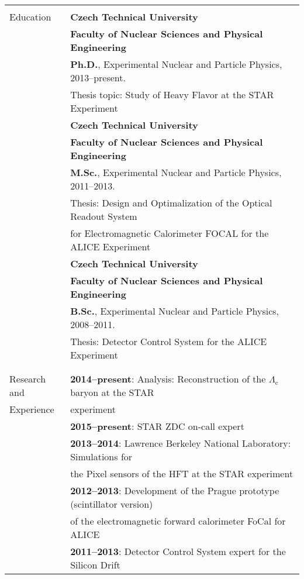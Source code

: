 \documentclass[a4paper,11pt,oneside]{article}
\begin{document}
\noindent \begin{tabular}{@{} l l}
\hline \\
 \Large{Education}    & \textbf{Czech Technical University} \\
     & \textbf{Faculty of Nuclear Sciences and Physical Engineering} \\
     & \textbf{Ph.D.}, Experimental Nuclear and Particle Physics, 2013--present. \\
     & Thesis topic: Study of Heavy Flavor at the STAR Experiment \\[.2cm]
     & \textbf{Czech Technical University} \\
     & \textbf{Faculty of Nuclear Sciences and Physical Engineering} \\
     & \textbf{M.Sc.}, Experimental Nuclear and Particle Physics, 2011--2013. \\
     & Thesis: Design and Optimalization of the Optical Readout System \\
     & for Electromagnetic Calorimeter FOCAL for the ALICE Experiment \\[.2cm]
     & \textbf{Czech Technical University} \\
     & \textbf{Faculty of Nuclear Sciences and Physical Engineering} \\
     & \textbf{B.Sc.}, Experimental Nuclear and Particle Physics, 2008--2011. \\
     & Thesis: Detector Control System for the ALICE Experiment \\
     & \\
     \\
 \Large{Research and}    & \textbf{2014--present}: Analysis: Reconstruction of the $\Lambda_\mathrm{c}$ baryon  at the STAR \\
 \Large{Experience}    & experiment \\[.2cm]
     & \textbf{2015--present}: STAR ZDC on-call expert \\[.2cm]
     & \textbf{2013--2014}: Lawrence Berkeley National Laboratory: Simulations for\\ 
     & the Pixel sensors of the HFT at the STAR experiment \\[.2cm]
     & \textbf{2012--2013}: Development of the Prague prototype (scintillator version) \\ 
     & of the electromagnetic forward calorimeter FoCal for ALICE\\[.2cm]
     & \textbf{2011--2013}: Detector Control System expert for the Silicon Drift \\

\end{tabular}
\end{document}
